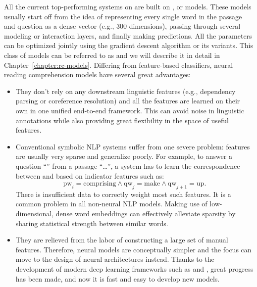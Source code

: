 All the current top-performing systems on  are built on , or  models. These models usually start off from the idea of representing every single word in the passage and question as a dense vector (e.g., 300 dimensions), passing through several modeling or interaction layers, and finally making predictions. All the parameters can be optimized jointly using the gradient descent algorithm or its variants. This class of models can be referred to as  and we will describe it in detail in Chapter~\ref{chapter:rc-models}. Differing from feature-based classifiers, neural reading comprehension models have several great advantages:
\begin{itemize}
    \item
        They don't rely on any downstream linguistic features (e.g., dependency parsing or coreference resolution) and all the features are learned on their own in one unified end-to-end framework. This can avoid noise in linguistic annotations while also providing great flexibility in the space of useful features.
    \item
        Conventional symbolic NLP systems suffer from one severe problem: features are usually very sparse and generalize poorly. For example, to answer a question ``'' from a passage ``\ldots\quad\quad{}'', a system has to learn the correspondence between  and  based on indicator features such as:
        $$\text{pw}_i = \text{comprising} \wedge \text{qw}_{j} = \text{make} \wedge \text{qw}_{j + 1} = \text{up}.$$
        There is insufficient data to correctly weight most such features. It is a common problem in all non-neural NLP models. Making use of low-dimensional, dense word embeddings can effectively alleviate sparsity by sharing statistical strength between similar words.
    \item
        They are relieved from the labor of constructing a large set of manual features. Therefore, neural models are conceptually simpler and the focus can move to the design of neural architectures instead. Thanks to the development of modern deep learning frameworks such as  and , great progress has been made, and now it is fast and easy to develop new models.
\end{itemize}

